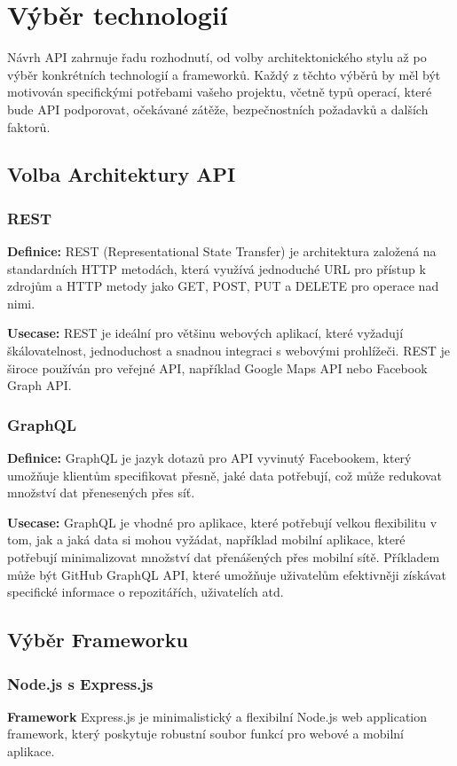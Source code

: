 \section{Výběr technologií}\label{sec:api-tech}

Návrh API zahrnuje řadu rozhodnutí, od volby architektonického stylu až po výběr konkrétních technologií a frameworků. Každý z těchto výběrů by měl být motivován specifickými potřebami vašeho projektu, včetně typů operací, které bude API podporovat, očekávané zátěže, bezpečnostních požadavků a dalších faktorů.

\subsection{Volba Architektury API}
\subsubsection*{REST}
\textbf{Definice:} REST (Representational State Transfer) je architektura založená na standardních HTTP metodách, která využívá jednoduché URL pro přístup k zdrojům a HTTP metody jako GET, POST, PUT a DELETE pro operace nad nimi.

\textbf{Usecase:} REST je ideální pro většinu webových aplikací, které vyžadují škálovatelnost, jednoduchost a snadnou integraci s webovými prohlížeči. REST je široce používán pro veřejné API, například Google Maps API nebo Facebook Graph API.

\subsubsection*{GraphQL}
\textbf{Definice:} GraphQL je jazyk dotazů pro API vyvinutý Facebookem, který umožňuje klientům specifikovat přesně, jaké data potřebují, což může redukovat množství dat přenesených přes síť.

\textbf{Usecase:} GraphQL je vhodné pro aplikace, které potřebují velkou flexibilitu v tom, jak a jaká data si mohou vyžádat, například mobilní aplikace, které potřebují minimalizovat množství dat přenášených přes mobilní sítě. Příkladem může být GitHub GraphQL API, které umožňuje uživatelům efektivněji získávat specifické informace o repozitářích, uživatelích atd.

\subsection{Výběr Frameworku}
\subsubsection*{Node.js s Express.js}
\textbf{Framework} Express.js je minimalistický a flexibilní Node.js web application framework, který poskytuje robustní soubor funkcí pro webové a mobilní aplikace.

